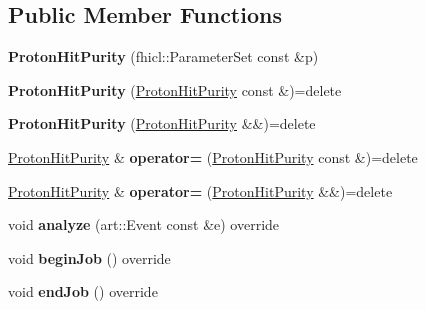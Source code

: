 \subsection*{Public Member Functions}
\begin{DoxyCompactItemize}
\item 
\hypertarget{classProtonHitPurity_abe7eb14746a7e1555142a2f97dd6c8a7}{{\bfseries Proton\-Hit\-Purity} (fhicl\-::\-Parameter\-Set const \&p)}\label{classProtonHitPurity_abe7eb14746a7e1555142a2f97dd6c8a7}

\item 
\hypertarget{classProtonHitPurity_a30e40f4da9dd297a45af8453698365be}{{\bfseries Proton\-Hit\-Purity} (\hyperlink{classProtonHitPurity}{Proton\-Hit\-Purity} const \&)=delete}\label{classProtonHitPurity_a30e40f4da9dd297a45af8453698365be}

\item 
\hypertarget{classProtonHitPurity_a5893503a8818f9e2b060529ff01c5643}{{\bfseries Proton\-Hit\-Purity} (\hyperlink{classProtonHitPurity}{Proton\-Hit\-Purity} \&\&)=delete}\label{classProtonHitPurity_a5893503a8818f9e2b060529ff01c5643}

\item 
\hypertarget{classProtonHitPurity_a79ea93f2e5ee376569b3db012f90bf72}{\hyperlink{classProtonHitPurity}{Proton\-Hit\-Purity} \& {\bfseries operator=} (\hyperlink{classProtonHitPurity}{Proton\-Hit\-Purity} const \&)=delete}\label{classProtonHitPurity_a79ea93f2e5ee376569b3db012f90bf72}

\item 
\hypertarget{classProtonHitPurity_af5c3fb096ec529ada9dbdb69ce78053f}{\hyperlink{classProtonHitPurity}{Proton\-Hit\-Purity} \& {\bfseries operator=} (\hyperlink{classProtonHitPurity}{Proton\-Hit\-Purity} \&\&)=delete}\label{classProtonHitPurity_af5c3fb096ec529ada9dbdb69ce78053f}

\item 
\hypertarget{classProtonHitPurity_a39595f8fc8677b6b95ce467f685ee276}{void {\bfseries analyze} (art\-::\-Event const \&e) override}\label{classProtonHitPurity_a39595f8fc8677b6b95ce467f685ee276}

\item 
\hypertarget{classProtonHitPurity_a6838668a5d854bd257375d1a437278ee}{void {\bfseries begin\-Job} () override}\label{classProtonHitPurity_a6838668a5d854bd257375d1a437278ee}

\item 
\hypertarget{classProtonHitPurity_accac7c769c035cb43c9d6e5a780ab241}{void {\bfseries end\-Job} () override}\label{classProtonHitPurity_accac7c769c035cb43c9d6e5a780ab241}

\end{DoxyCompactItemize}
